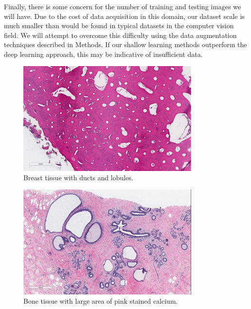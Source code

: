 \documentclass[10pt,twocolumn,letterpaper]{article}
\begin{document}
Finally, there is some concern for the number of training and testing images
we will have. Due to the cost of data acquisition in this domain, our dataset
scale is much smaller than would be found in typical datasets in the computer
vision field. We will attempt to overcome this difficulty using the data
augmentation techniques described in Methods. If our shallow learning
methods outperform the deep learning approach, this may be indicative of
insufficient data.

\begin{figure}[h]
\begin{center}
   \includegraphics[width=0.9\linewidth]{figures/image00.png}
\end{center}
    \caption
    {%
        Breast tissue with ducts and lobules.
    }
\label{fig:long}
\label{fig:onecol}
\end{figure}

\begin{figure}[h]
\begin{center}
   \includegraphics[width=0.9\linewidth]{figures/image01.png}
\end{center}
    \caption
    {%
        Bone tissue with large area of pink stained calcium.
    }
\label{fig:long}
\label{fig:onecol}
\end{figure}
\end{document}
